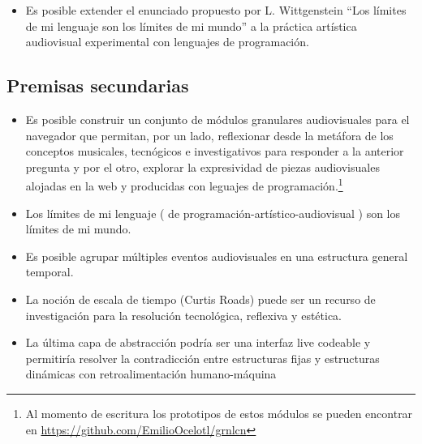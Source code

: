 
\begin{itemize}

\item Es posible extender el enunciado propuesto por L. Wittgenstein ``Los límites de mi lenguaje son los límites de mi mundo'' a la práctica artística audiovisual experimental con lenguajes de programación. 
\end{itemize}

\subsection{Premisas secundarias}


\begin{itemize}

\item Es posible construir un conjunto de módulos granulares audiovisuales para el navegador que permitan, por un lado, reflexionar desde la metáfora de los conceptos musicales, tecnógicos e investigativos para responder a la anterior pregunta y por el otro, explorar la expresividad de piezas audiovisuales alojadas en la web y producidas con leguajes de programación.\footnote{Al momento de escritura los prototipos de estos módulos se pueden encontrar en \url{https://github.com/EmilioOcelotl/grnlcn}}
\item Los límites de mi lenguaje ( de programación-artístico-audiovisual ) son los límites de mi mundo.
\item Es posible agrupar múltiples eventos audiovisuales en una estructura general temporal.
\item La noción de escala de tiempo (Curtis Roads) puede ser un recurso de investigación para la resolución tecnológica, reflexiva y estética.

  
\item La última capa de abstracción podría ser una interfaz live codeable y permitiría resolver la contradicción entre estructuras fijas y estructuras dinámicas con retroalimentación humano-máquina


\end{itemize}

